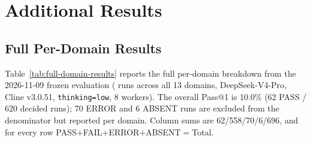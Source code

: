 \section{Additional Results}
\label{sec:additional-results}


\subsection{Full Per-Domain Results}
\label{sec:full-per-domain}

Table~\ref{tab:full-domain-results} reports the full per-domain breakdown from the 2026-11-09 frozen evaluation (\Neval{} runs across all 13 domains, DeepSeek-V4-Pro, Cline v3.0.51, \texttt{thinking=low}, 8 workers). The overall Pass@1 is 10.0\% (62 PASS / 620 decided runs); 70 ERROR and 6 ABSENT runs are excluded from the denominator but reported per domain. Column sums are 62/558/70/6/696, and for every row PASS$+$FAIL$+$ERROR$+$ABSENT$=$Total.

